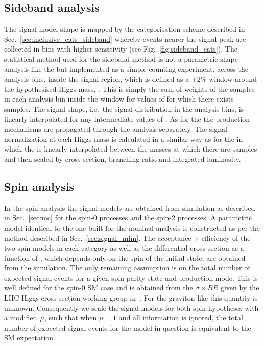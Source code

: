 \subsection{Sideband analysis}
\label{sec:sig_sideband}

The signal model shape is mapped by the categorisation scheme described in Sec.~\ref{sec:inclusive_cats_sideband} whereby events nearer the signal peak are collected in bins with higher sensitivity (see Fig.~\ref{fig:sideband_cats}). The statistical method used for the sideband method is not a parametric shape analysis like the \MFM but implemented as a simple counting experiment, across the analysis bins, inside the signal region, which is defined as a $\pm$2\% window around the hypothesised Higgs mass, \mH. This is simply the sum of weights of the \MC samples in each analysis bin inside the window for values of \mH for which there exists \MC samples. The signal shape, i.e.~the signal distribution in the analysis bins, is linearly interpolated for any intermediate values of \mH. As for the \MFM the \SM production mechanisms are propagated through the analysis separately. The signal normalization at each Higgs mass is calculated in a similar way as for the \MFM in which the \ea is linearly interpolated between the masses at which there are \MC samples and then scaled by cross section, branching ratio and integrated luminosity. 

\subsection{Spin analysis}

In the spin analysis the signal models are obtained from \MC simulation as described in Sec.~\ref{sec:mc} for the spin-0 \SM processes and the spin-2 processes. A parametric model identical to the one built for the nominal analysis is constructed as per the method described in Sec.~\ref{sec:signal_mfm}. The acceptance $\times$ efficiency of the two spin models in each category as well as the differential cross section as a function of \abscostheta, which depends only on the spin of the initial state, are obtained from the \MC simulation. The only remaining assumption is on the total number of expected signal events for a given spin-parity state and production mode. This is well defined for the spin-0 SM case and is obtained from the $\sigma\times BR$ given by the LHC Higgs cross section working group in~\cite{LHCHiggsCrossSectionWorkingGroup3}. For the graviton-like \twomp this quantity is unknown. 
Consequently we scale the signal models for both spin hypotheses with a modifier, $\mu$, such that when $\mu=1$ and all \costhetastar information is ignored, the total number of expected signal events for the model in question is equivalent to the SM expectation. 

